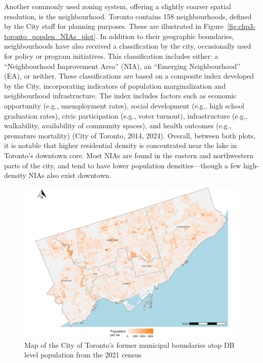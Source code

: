 \documentclass[
11pt, %
oneside, %
english, %
singlespacing, %
]{macthesis} %
\begin{document}
Another commonly used zoning system, offering a slightly coarser spatial resolution, is the neighbourhood. Toronto contains 158 neighbourhoods, defined by the City staff for planning purposes. These are illustrated in Figure~\ref{fig:chp3-toronto_popden_NIAs_plot}. In addition to their geographic boundaries, neighbourhoods have also received a classification by the city, occasionally used for policy or program initiatives. This classification includes either: a ``Neighbourhood Improvement Area'' (NIA), an ``Emerging Neighbourhood'' (EA), or neither. These classifications are based on a composite index developed by the City, incorporating indicators of population marginalization and neighbourhood infrastructure. The index includes factors such as economic opportunity (e.g., unemployment rates), social development (e.g., high school graduation rates), civic participation (e.g., voter turnout), infrastructure (e.g., walkability, availability of community spaces), and health outcomes (e.g., premature mortality) (City of Toronto, 2014, 2024). Overall, between both plots, it is notable that higher residential density is concentrated near the lake in Toronto's downtown core. Most NIAs are found in the eastern and northwestern parts of the city, and tend to have lower population densities---though a few high-density NIAs also exist downtown.

\begin{figure}

{\centering \includegraphics[width=6in]{./data/figures/chp3-former_muni_boundaries_plot} 

}

\caption{\label{fig:chp3-former_muni_boundaries_plot}Map of the City of Toronto's former municipal boundaries atop DB level population from the 2021 census}\label{fig:unnamed-chunk-43}
\end{figure}
\end{document}
